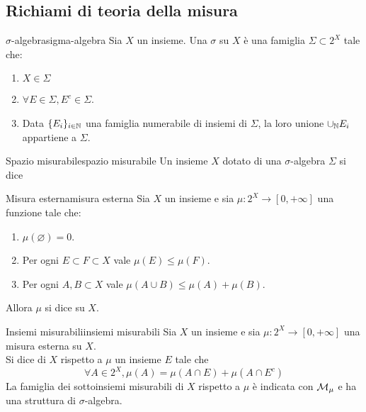 \documentclass{article}
\begin{document}
\subsection{Richiami di teoria della misura}

\begin{definition}{$\sigma$-algebra}{sigma-algebra}
    Sia $X$ un insieme. Una $\sigma$ su $X$ è una famiglia $\Sigma \subset 2^X$ tale che:\begin{enumerate}
        \item $X \in \Sigma$
        \item $\forall E \in \Sigma, E^c \in \Sigma$.
        \item Data $\{E_i\}_{i \in \mathbb{N}}$ una famiglia numerabile di insiemi di $\Sigma$, la loro unione $\cup_{\mathbb{N}} E_i$ appartiene a $\Sigma$.
    \end{enumerate}
\end{definition}

\begin{definition}{Spazio misurabile}{spazio misurabile}
    Un insieme $X$ dotato di una $\sigma$-algebra $\Sigma$ si dice 
\end{definition}

\begin{definition}{Misura esterna}{misura esterna}
    Sia $X$ un insieme e sia $\mu : 2^X\to [0, +\infty]$ una funzione tale che:\begin{enumerate}
        \item $\mu(\varnothing) = 0$.
        \item Per ogni $E \subset F \subset X$ vale $\mu(E)\le\mu(F)$.
        \item Per ogni $A,B \subset X$ vale $\mu(A\cup B) \le \mu(A) + \mu(B)$.
    \end{enumerate}
    Allora $\mu$ si dice  su $X$.
\end{definition}

\begin{definition}{Insiemi misurabili}{insiemi misurabili}
    Sia $X$ un insieme e sia $\mu: 2^X\to[0, + \infty]$ una misura esterna su $X$.\\
    Si dice  di $X$ rispetto a $\mu$ un insieme $E$ tale che
    \[\forall A \in 2^X, \mu(A) = \mu(A \cap E) + \mu(A\cap E^c)\]
    La famiglia dei sottoinsiemi misurabili di $X$ rispetto a $\mu$ è indicata con $\mathcal{M}_\mu$ e ha una struttura di $\sigma$-algebra.
\end{definition}
\end{document}
